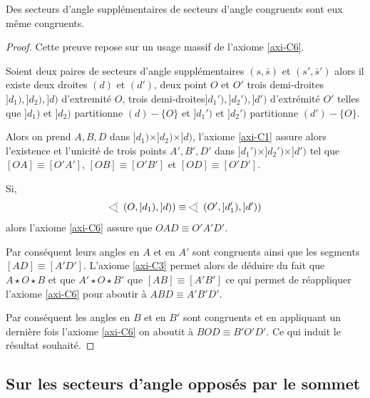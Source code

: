 \begin{lem}\label{lem-secteurssupplementairecongru}
    Des secteurs d'angle supplémentaires de secteurs d'angle congruents sont eux même congruents. 
\begin{proof}
    Cette preuve repose sur un usage massif de l'axiome \ref{axi-C6}.

    Soient deux paires de secteurs d'angle supplémentaires $(s,\bar{s})$ et $(s',\bar{s}')$ alors il existe deux droites $(d)$ et $(d')$, deux point $O$ et $O'$ trois demi-droites $]d_1),]d_2),]d)$ d'extremité $O$, trois demi-droites$ ]d_1'),]d_2'),]d')$ d'extrémité $O'$ telles que $]d_1)$ et $]d_2)$ partitionne $(d)-\{O\}$ et $]d_1')$ et $]d_2')$ partitionne $(d')-\{O\}$. 

    Alors on prend $A,B,D$ dans $]d_1)\times]d_2)\times]d)$, l'axiome \ref{axi-C1} assure alors l'existence et l'unicité de trois points $A',B',D'$ dans $]d_1')\times]d_2')\times]d')$ tel que $[OA]\equiv[O'A']$, $[OB]\equiv[O'B']$ et $[OD]\equiv[O'D']$.

    Si,
    \begin{equation*}
        \anglesaillant\left(O,]d_1),]d)\right)\equiv \anglesaillant\left(O',]d_1'),]d')\right)
    \end{equation*}
    alors l'axiome \ref{axi-C6} assure que  $OAD\equiv O'A'D'$. 
    
    Par conséquent leurs angles en $A$ et en $A'$ sont congruents ainsi que les segments $[AD]\equiv[A'D']$. L'axiome \ref{axi-C3} permet alors de déduire du fait que $A\star O\star B$ et que $A'\star O\star B'$ que $[AB]\equiv [A'B']$ ce qui permet de réappliquer l'axiome \ref{axi-C6} pour aboutir à $ABD\equiv A'B'D'$.

    Par conséquent les angles en $B$ et en $B'$ sont congruents et en appliquant un dernière fois l'axiome \ref{axi-C6} on aboutit à $BOD\equiv B'O'D'$. Ce qui induit le résultat souhaité.
\end{proof}
\end{lem}

    \subsection{Sur les secteurs d'angle opposés par le sommet}

